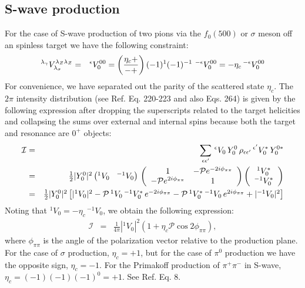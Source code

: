 \subsection{S-wave production}
For the case of S-wave production of two pions via the $f_0(500)$ or $\sigma$ meson off an spinless target we have the following constraint:
\begin{eqnarray}
^{\lambda_\gamma}V_{\lambda_\sigma}^{\lambda_{Z}\lambda_{Z}} & = & ^{\epsilon}V_{0}^{00} = \left( \eta_c+ \over -+ \right) (-1)^1 (-1)^{-1} \,\,^{-\epsilon} V_0^{00} = - \eta_c\,^{-\epsilon}V_0^{00}
\end{eqnarray}
For convenience, we have separated out the parity of the scattered state $\eta_c$. 
The $2\pi$ intensity distribution (see Ref.\cite{Salgado:2013dja} Eq. 220-223 and also Eqs. 264) is given by the following expression after 
dropping the superscripts  related to the target helicities and collapsing 
the sums over external and internal spins  because both the target and resonance are $0^+$ objects:
\begin{eqnarray}
\mathcal{I} & = & \sum\limits_{\epsilon \epsilon'} \, ^\epsilon V_0 \, Y_0^0 \, \rho_{\epsilon \epsilon'} \, ^{\epsilon'}V_0^* \, Y_0^{0*}   \label{eq:swave_intensity}\\
 & = & \textstyle{\frac{1}{2}}  |Y_0^0|^2     \left( ^1V_0 \hspace{0.3cm} ^{-1}V_0 \right) \, \left( \begin{array}{cc} 1 & -\mathcal{P}e^{-2i\phi_{\pi\pi}} \\
-\mathcal{P}e^{2i\phi_{\pi\pi}} & 1 \end{array} \right)  \left( \begin{array}{c} ^1V_0^* \\ ^{-1}V_0^* \end{array} \right) \\
& = &  \textstyle{\frac{1}{2}}  |Y_0^0|^2  \left[ |^1V_0|^2 - \mathcal{P} \,^{1}V_0 \,^{-1}V_0^* \, e^{-2i\phi_{\pi\pi}} - \mathcal{P} \,^{1}V_0^* \,^{-1}V_0\, e^{2i\phi_{\pi\pi}}  +  |^{-1}V_0|^2  \right]
\end{eqnarray}
Noting that $^{1}V_0 = -\eta_c\,^{-1}V_0$, we obtain the following expression:
\begin{eqnarray}
\mathcal{I} & = &  \textstyle{\frac{1}{4\pi}}   |^1V_0|^2 \left(1 + \eta_c \mathcal{P} \cos{2\phi_{\pi\pi}} \right),
\end{eqnarray} 
where $\phi_{\pi\pi}$ is the angle of the polarization vector relative to the production plane. For the case of $\sigma$ production, $\eta_c = +1$, but for the case of $\pi^0$ production we have
the opposite sign, $\eta_c = -1$.
For the Primakoff production of $\pi^+\pi^-$ in S-wave, $\eta_c = (-1)(-1)(-1)^0 = +1$. See Ref. \cite{CPPexp} Eq. 8. 

